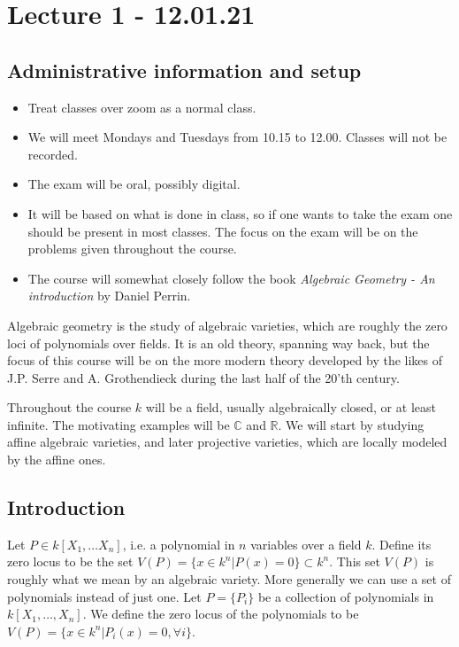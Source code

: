 \section{Lecture 1 - 12.01.21}

\subsection{Administrative information and setup}
\begin{itemize}
    \item Treat classes over zoom as a normal class.
    \item We will meet Mondays and Tuesdays from 10.15 to 12.00. Classes will not be recorded.
    \item The exam will be oral, possibly digital.
    \item It will be based on what is done in class, so if one wants to take the exam one should be present in most classes. The focus on the exam will be on the problems given throughout the course.
    \item The course will somewhat closely follow the book \textit{Algebraic Geometry - An introduction} by Daniel Perrin.  
\end{itemize}



Algebraic geometry is the study of algebraic varieties, which are roughly the zero loci of polynomials over fields. It is an old theory, spanning way back, but the focus of this course will be on the more modern theory developed by the likes of J.P. Serre and A. Grothendieck during the last half of the 20'th century. 

Throughout the course $k$ will be a field, usually algebraically closed, or at least infinite. The motivating examples will be $\mathbb{C}$ and $\mathbb{R}$. We will start by studying affine algebraic varieties, and later projective varieties, which are locally modeled by the affine ones. 

\subsection{Introduction}

Let $P\in k[X_1, \ldots X_n]$, i.e. a polynomial in $n$ variables over a field $k$. Define its zero locus to be the set $V(P) = \{ x\in k^n \vert P(x)=0 \}\subset k^n$. This set $V(P)$ is roughly what we mean by an algebraic variety. More generally we can use a set of polynomials instead of just one. Let $P=\{ P_i\}$ be a collection of polynomials in $k[X_1, \ldots, X_n]$. We define the zero locus of the polynomials to be $V(P) = \{ x\in k^n \vert P_i(x)=0, \forall i\}$. 

